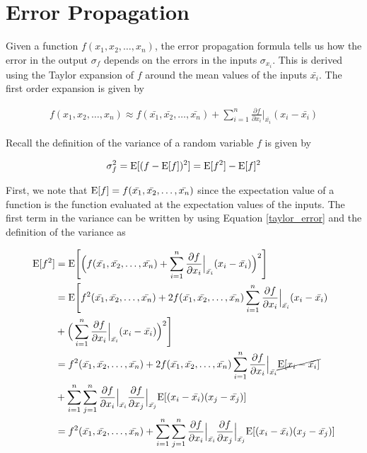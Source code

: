\section{Error Propagation}

Given a function $f(x_1, x_2, \dots, x_n)$, the error propagation formula tells us how the error in the output $\sigma_f$ depends on the errors in the inputs $\sigma_{x_i}$. This
is derived using the Taylor expansion of $f$ around the mean values of the inputs $\bar{x_i}$. The first order expansion is given by

\begin{align}\label{taylor_error}
f(x_1, x_2, \dots, x_n) \approx f(\bar{x_1}, \bar{x_2}, \dots, \bar{x_n}) + \sum_{i=1}^n \frac{\partial f}{\partial x_i}\Bigg|_{\bar{x_i}}(x_i-\bar{x_i})
\end{align}

Recall the definition of the variance of a random variable $f$ is given by

\begin{align}
\sigma_f^2 = \mathrm{E}[(f-\mathrm{E}[f])^2] = \mathrm{E}[f^2] - \mathrm{E}[f]^2
\end{align}


First, we note that $\mathrm{E}[f] = f(\bar{x_1}, \bar{x_2}, \dots, \bar{x_n})$ since the expectation value of a function is the function evaluated at the expectation values of the inputs.
The first term in the variance can be written by using Equation \ref{taylor_error} and the definition of the variance as

\begin{align}
\mathrm{E}[f^2] &= \mathrm{E}\Bigg[\Big(f(\bar{x_1}, \bar{x_2}, \dots, \bar{x_n}) + \sum_{i=1}^n \frac{\partial f}{\partial x_i}\Big|_{\bar{x_i}}(x_i-\bar{x_i})\Big)^2\Bigg]\\
&= \mathrm{E}\Bigg[f^2(\bar{x_1}, \bar{x_2}, \dots, \bar{x_n}) + 2f(\bar{x_1}, \bar{x_2}, \dots, \bar{x_n})\sum_{i=1}^n \frac{\partial f}{\partial x_i}\Big|_{\bar{x_i}}(x_i-\bar{x_i})\\
&+ \Big(\sum_{i=1}^n \frac{\partial f}{\partial x_i}\Big|_{\bar{x_i}}(x_i-\bar{x_i})\Big)^2\Bigg]\\
&= f^2(\bar{x_1}, \bar{x_2}, \dots, \bar{x_n}) + 2f(\bar{x_1}, \bar{x_2}, \dots, \bar{x_n})\sum_{i=1}^n \frac{\partial f}{\partial x_i}\Big|_{\bar{x_i}}\cancel{\mathrm{E}[x_i-\bar{x_i}]}\\
&+ \sum_{i=1}^n \sum_{j=1}^n \frac{\partial f}{\partial x_i}\Big|_{\bar{x_i}}\frac{\partial f}{\partial x_j}\Big|_{\bar{x_j}}\mathrm{E}[(x_i-\bar{x_i})(x_j-\bar{x_j})]\\
&= f^2(\bar{x_1}, \bar{x_2}, \dots, \bar{x_n}) + \sum_{i=1}^n \sum_{j=1}^n \frac{\partial f}{\partial x_i}\Big|_{\bar{x_i}}\frac{\partial f}{\partial x_j}\Big|_{\bar{x_j}}\mathrm{E}[(x_i-\bar{x_i})(x_j-\bar{x_j})]
\end{align}

